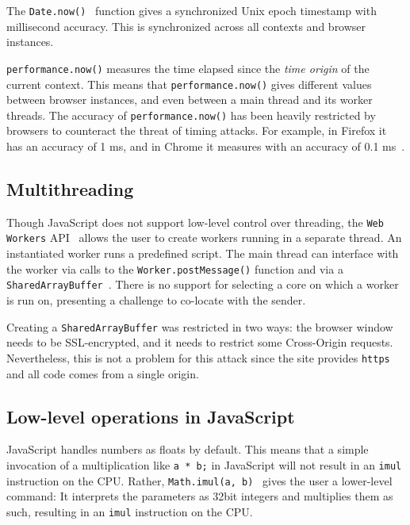 \documentclass[11pt,
  titlepage=false,
]{scrreprt}
\begin{document}
The \texttt{Date.now()}~\cite{datenow} function gives a synchronized Unix epoch timestamp with millisecond accuracy.
This is synchronized across all contexts and browser instances.

\texttt{performance.now()} measures the time elapsed since the \textit{time origin} of the current context.
This means that \texttt{performance.now()} gives different values between browser instances, and even between a main thread and its worker threads.
The accuracy of \texttt{performance.now()} has been heavily restricted by browsers to counteract the threat of timing attacks.
For example, in Firefox it has an accuracy of 1 ms, and in Chrome it measures with an accuracy of 0.1 ms~\cite{performancenow, performancenowchrome}.

\subsection{Multithreading}\label{subsec:multithreading}
Though JavaScript does not support low-level control over threading, the \texttt{Web Workers} API~\cite{webworkers} allows the user to create workers running in a separate thread.
An instantiated worker runs a predefined script.
The main thread can interface with the worker via calls to the \texttt{Worker.postMessage()} function and via a \texttt{SharedArrayBuffer}~\cite{sharedarraybuffer}.
There is no support for selecting a core on which a worker is run on, presenting a challenge to co-locate with the sender.

Creating a \texttt{SharedArrayBuffer} was restricted in two ways: the browser window needs to be SSL-encrypted, and it needs to restrict some Cross-Origin requests.
Nevertheless, this is not a problem for this attack since the site provides \texttt{https} and all code comes from a single origin.


\subsection{Low-level operations in JavaScript}\label{subsec:lowleveljs}
JavaScript handles numbers as floats by default.
This means that a simple invocation of a multiplication like \texttt{a * b;} in JavaScript will not result in an \texttt{imul} instruction on the CPU.
Rather, \texttt{Math.imul(a, b)}~\cite{mathimul} gives the user a lower-level command:
It interprets the parameters as 32bit integers and multiplies them as such, resulting in an \texttt{imul} instruction on the CPU.
\end{document}
